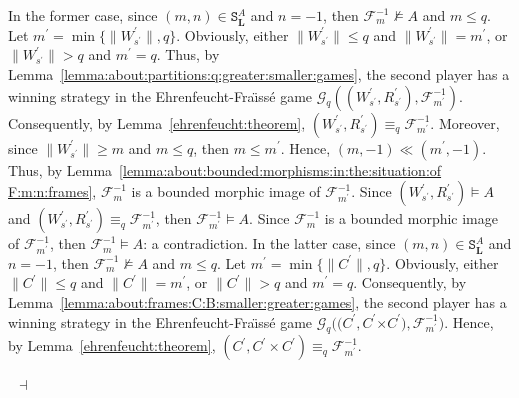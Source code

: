 \documentclass[draft]{article}
\newenvironment{proof}{{\bf Proof:}}{~$\dashv$\\}
\def\L{\mathbf{L}}
\begin{document}
\begin{proof}
In the former case, since $(m,n){\in}\mathtt{S}_{\L}^{A}$ and $n{=}{-}1$, then ${\mathcal F}_{m}^{{-}1}{\not\models}A$ and $m{\leq}q$.
Let $m^{\prime}{=}\min\{{\parallel}W^{\prime}_{s^{\prime}}{\parallel},q\}$.
Obviously, either ${\parallel}W^{\prime}_{s^{\prime}}{\parallel}{\leq}q$ and ${\parallel}W^{\prime}_{s^{\prime}}{\parallel}{=}m^{\prime}$, or ${\parallel}W^{\prime}_{s^{\prime}}{\parallel}{>}q$ and $m^{\prime}{=}q$.
Thus, by Lemma~\ref{lemma:about:partitions:q:greater:smaller:games}, the second player has a winning strategy in the Ehren\-feucht-Fra\"\i ss\'e game ${\mathcal G}_{q}((W^{\prime}_{s^{\prime}},R^{\prime}_{s^{\prime}}),{\mathcal F}_{m^{\prime}}^{{-}1})$.
Consequently, by Lemma~\ref{ehrenfeucht:theorem}, $(W^{\prime}_{s^{\prime}},R^{\prime}_{s^{\prime}}){\equiv_{q}}{\mathcal F}_{m^{\prime}}^{{-}1}$.
Moreover, since ${\parallel}W^{\prime}_{s^{\prime}}{\parallel}{\geq}m$ and $m{\leq}q$, then $m{\leq}m^{\prime}$.
Hence, $(m,{-}1){\ll}(m^{\prime},{-}1)$.
Thus, by Lemma~\ref{lemma:about:bounded:morphisms:in:the:situation:of F:m:n:frames}, ${\mathcal F}_{m}^{{-}1}$ is a bounded morphic image of ${\mathcal F}_{m^{\prime}}^{{-}1}$.
Since $(W^{\prime}_{s^{\prime}},R^{\prime}_{s^{\prime}})
%
%
%
%
%
%
%
%
%
%
%
%
$\linebreak$
%
%
%
%
%
%
%
%
%
%
%
%
{\models}A$ and $(W^{\prime}_{s^{\prime}},R^{\prime}_{s^{\prime}}){\equiv_{q}}{\mathcal F}_{m^{\prime}}^{{-}1}$, then ${\mathcal F}_{m^{\prime}}^{{-}1}{\models}A$.
Since ${\mathcal F}_{m}^{{-}1}$ is a bounded morphic image of ${\mathcal F}_{m^{\prime}}^{{-}1}$, then ${\mathcal F}_{m}^{{-}1}{\models}A$: a contradiction.
In the latter case, since $(m,n){\in}\mathtt{S}_{\L}^{A}$ and $n{=}{-}1$, then ${\mathcal F}_{m}^{{-}1}{\not\models}A$ and $m{\leq}q$.
Let $m^{\prime}{=}\min\{{\parallel}C^{\prime}{\parallel},q\}$.
Obviously, either ${\parallel}C^{\prime}{\parallel}{\leq}q$ and ${\parallel}C^{\prime}{\parallel}{=}m^{\prime}$, or ${\parallel}C^{\prime}{\parallel}{>}q$ and $m^{\prime}{=}q$.
Consequently, by Lemma~\ref{lemma:about:frames:C:B:smaller:greater:games}, the second player has a winning strategy in the Ehren\-feucht-Fra\"\i ss\'e game ${\mathcal G}_{q}((C^{\prime},C^{\prime}
%
%
%
%
%
%
%
%
%
%
%
%
$\linebreak$
%
%
%
%
%
%
%
%
%
%
%
%
{\times}C^{\prime}),{\mathcal F}_{m^{\prime}}^{{-}1})$.
Hence, by Lemma~\ref{ehrenfeucht:theorem}, $(C^{\prime},C^{\prime}{\times}C^{\prime}){\equiv_{q}}{\mathcal F}_{m^{\prime}}^{{-}1}$.

\end{proof}
\end{document}
